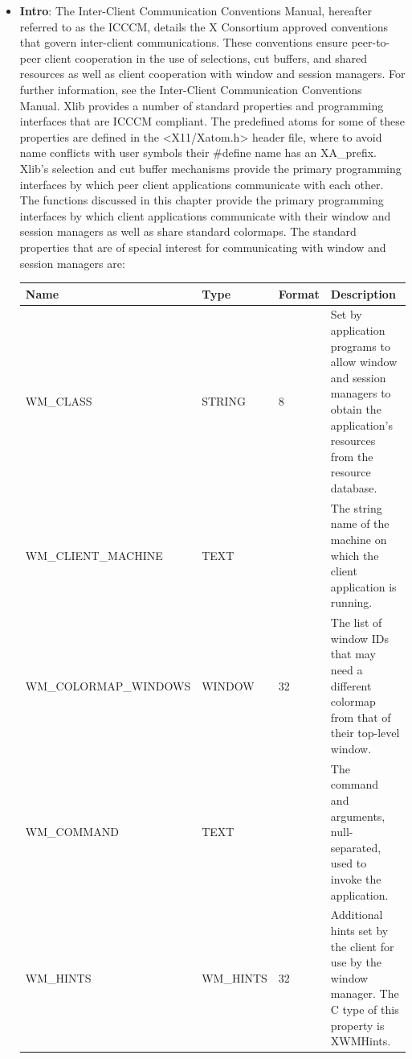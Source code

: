 \documentclass{report}
\begin{document}
\begin{itemize}
    \pagebreak 
    \begin{itemize}
        \item \textbf{Intro}: The Inter-Client Communication Conventions Manual, hereafter referred to as the ICCCM, details the X Consortium approved conventions that govern inter-client communications. These conventions ensure peer-to-peer client cooperation in the use of selections, cut buffers, and shared resources as well as client cooperation with window and session managers. For further information, see the Inter-Client Communication Conventions Manual.
            \bigbreak \noindent 
            Xlib provides a number of standard properties and programming interfaces that are ICCCM compliant. The predefined atoms for some of these properties are defined in the <X11/Xatom.h> header file, where to avoid name conflicts with user symbols their #define name has an XA\_prefix.
            \bigbreak \noindent 
            Xlib’s selection and cut buffer mechanisms provide the primary programming interfaces by which peer client applications communicate with each other. The functions discussed in this chapter provide the primary programming interfaces by which client applications communicate with their window and session managers as well as share standard colormaps.
            \bigbreak \noindent 
            The standard properties that are of special interest for communicating with window and session managers are:
            \begin{center}
                \begin{tabularx}{\textwidth}{@{}XllX@{}}
                    \toprule
                    \textbf{Name}& \textbf{Type}& \textbf{Format}& \textbf{Description} \\
                    \midrule
                    WM\_CLASS &STRING &8 &Set by application programs to allow window and session managers to obtain the application’s resources from the resource database.\\[2ex]
                    WM\_CLIENT\_MACHINE &TEXT& &The string name of the machine on which the client application is running.\\[2ex]
                    WM\_COLORMAP\_WINDOWS &WINDOW &32 &The list of window IDs that may need a different colormap from that of their top-level window.\\[2ex]
                    WM\_COMMAND &TEXT & &The command and arguments, null-separated, used to invoke the application.\\[2ex]
                    WM\_HINTS &WM\_HINTS &32& Additional hints set by the client for use by the window manager. The C type of this property is XWMHints.\\[2ex]

\end{tabularx}
\end{center}
\end{itemize}
\end{itemize}
\end{document}
